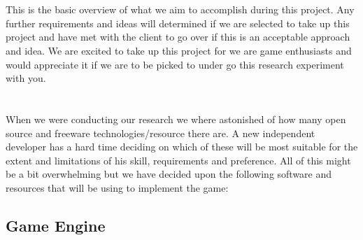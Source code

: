 \documentclass[letterpaper]{article}
\begin{document}
			\\
			\\
			This is the basic overview of what we aim to accomplish during this project. Any further requirements and ideas will determined if we are selected to take up this project and have met with the client to go over if this is an acceptable approach and idea. We are excited to take up this project for we are game enthusiasts and would appreciate it if we are to be picked to under go this research experiment with you.
		
		\vspace{0.2in}
		
		\section*{\colorbox{blue}{}} 
		
		\vspace{0.2in}
		
		When we were conducting our research we where astonished of how many open source and freeware technologies/resource there are. A new independent developer has a hard time deciding on which of these will be most suitable for the extent and limitations of his skill, requirements and preference. All of this might be a bit overwhelming but we have decided upon the following software and resources that will be using to implement the game:
		
			
			\subsection*{Game Engine}
			
			\vspace{0.1cm}
			
\end{document}
